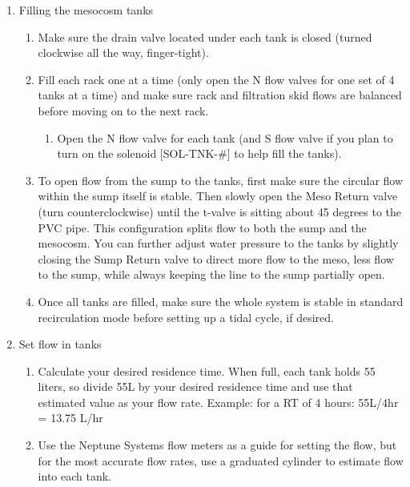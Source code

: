 \documentclass[
]{book}
\providecommand{\tightlist}{%
  \setlength{\itemsep}{0pt}\setlength{\parskip}{0pt}}
\begin{document}
\begin{enumerate}
\def\labelenumi{\arabic{enumi}.}
\tightlist
\item
  Filling the mesocosm tanks

  \begin{enumerate}
  \def\labelenumii{\arabic{enumii}.}
  \tightlist
  \item
    Make sure the drain valve located under each tank is closed (turned clockwise all the way, finger-tight).
  \item
    Fill each rack one at a time (only open the N flow valves for one set of 4 tanks at a time) and make sure rack and filtration skid flows are balanced before moving on to the next rack.

    \begin{enumerate}
    \def\labelenumiii{\arabic{enumiii}.}
    \tightlist
    \item
      Open the N flow valve for each tank (and S flow valve if you plan to turn on the solenoid {[}SOL-TNK-\#{]} to help fill the tanks).
    \end{enumerate}
  \item
    To open flow from the sump to the tanks, first make sure the circular flow within the sump itself is stable. Then slowly open the Meso Return valve (turn counterclockwise) until the t-valve is sitting about 45 degrees to the PVC pipe. This configuration splits flow to both the sump and the mesocosm. You can further adjust water pressure to the tanks by slightly closing the Sump Return valve to direct more flow to the meso, less flow to the sump, while always keeping the line to the sump partially open.
  \item
    Once all tanks are filled, make sure the whole system is stable in standard recirculation mode before setting up a tidal cycle, if desired.
  \end{enumerate}
\item
  Set flow in tanks

  \begin{enumerate}
  \def\labelenumii{\arabic{enumii}.}
  \tightlist
  \item
    Calculate your desired residence time. When full, each tank holds 55 liters, so divide 55L by your desired residence time and use that estimated value as your flow rate. Example: for a RT of 4 hours: 55L/4hr = 13.75 L/hr
  \item
    Use the Neptune Systems flow meters as a guide for setting the flow, but for the most accurate flow rates, use a graduated cylinder to estimate flow into each tank.


\end{enumerate}
\end{enumerate}
\end{document}
